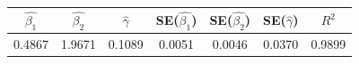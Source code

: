 \begin{tabular}{ccccccc}
\toprule
$\hat{\beta_1}$ & $\hat{\beta_2}$ & $\hat{\gamma}$ & SE($\hat{\beta_1}$) & SE($\hat{\beta_2}$) & SE($\hat{\gamma}$) & $R^2$ \\
\midrule
0.4867 & 1.9671 & 0.1089 & 0.0051 & 0.0046 & 0.0370 & 0.9899 \\
\bottomrule
\end{tabular}